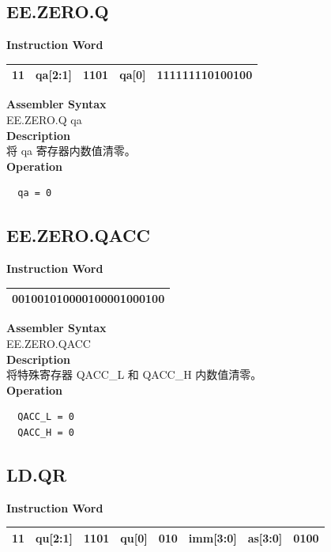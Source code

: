 \clearpage
\subsection{EE.ZERO.Q}\label{instruction:EEZEROQ}
\setlength\tabcolsep{6pt}
\textbf{Instruction Word} \\
\begin{tabular}{|c|c|c|c|c|}
	\hline
	11 & qa[2:1] & 1101 & qa[0] & 111111110100100 \\
	\hline
\end{tabular}

\textbf{Assembler Syntax} \\
EE.ZERO.Q qa \\
\textbf{Description} \\
将 qa 寄存器内数值清零。\\
\textbf{Operation}
\begin{lstlisting}
  qa = 0
\end{lstlisting}

\clearpage
\subsection{EE.ZERO.QACC}\label{instruction:EEZEROQACC}
\setlength\tabcolsep{6pt}
\textbf{Instruction Word} \\
\begin{tabular}{|c|}
	\hline
	001001010000100001000100 \\
	\hline
\end{tabular}

\textbf{Assembler Syntax} \\
EE.ZERO.QACC  \\
\textbf{Description} \\
将特殊寄存器 QACC\_L 和 QACC\_H 内数值清零。\\
\textbf{Operation}
\begin{lstlisting}
  QACC_L = 0
  QACC_H = 0
\end{lstlisting}


\clearpage
\subsection{LD.QR}\label{instruction:LDQR}
\setlength\tabcolsep{6pt}
\textbf{Instruction Word} \\
\begin{tabular}{|c|c|c|c|c|c|c|c|}
  \hline
  11 & qu[2:1] & 1101 & qu[0] & 010 & imm[3:0] & as[3:0] & 0100 \\
  \hline
\end{tabular}

